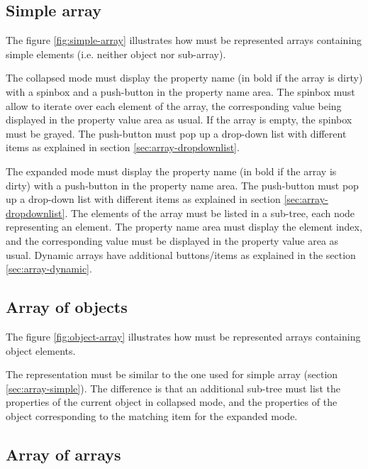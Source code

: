 \documentclass[a4paper, twoside]{report}
\begin{document}
\subsection{Simple array\label{sec:array-simple}}

The figure \ref{fig:simple-array} illustrates how must be represented arrays containing simple
elements (i.e. neither object nor sub-array).

The collapsed mode must display the property name (in bold if the array is dirty) with a spinbox and
a push-button in the property name area. The spinbox must allow to iterate
over each element of the array, the corresponding value being displayed in the property value area
as usual. If the array is empty, the spinbox must be grayed. The push-button must pop up a
drop-down list with different items as explained in section \ref{sec:array-dropdownlist}.

The expanded mode must display the property name (in bold if the array is dirty) with a push-button
in the property name area. The push-button must pop up a drop-down list with different items as
explained in section \ref{sec:array-dropdownlist}. The elements of the array must be listed in a
sub-tree, each node representing an element. The property name area must display the element
index, and the corresponding value must be displayed in the property value area as usual. Dynamic
arrays have additional buttons/items as explained in the section \ref{sec:array-dynamic}.


\subsection{Array of objects\label{sec:array-object}}

The figure \ref{fig:object-array} illustrates how must be represented arrays containing object
elements.

The representation must be similar to the one used for simple array (section
\ref{sec:array-simple}). The difference is that an additional sub-tree must list the properties of the
current object in collapsed mode, and the properties of the object corresponding to the matching
item for the expanded mode.


\subsection{Array of arrays\label{sec:array-subarray}}
\end{document}
